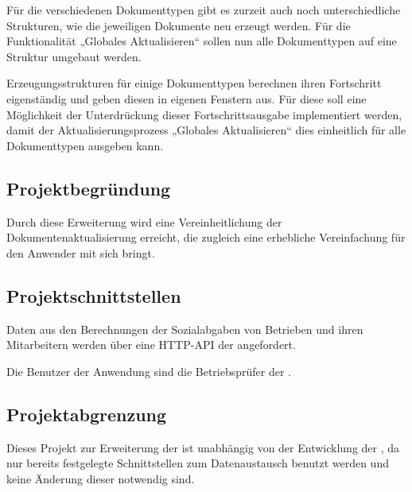 Für die verschiedenen Dokumenttypen gibt es zurzeit auch noch unterschiedliche Strukturen, wie die jeweiligen Dokumente neu erzeugt werden. Für die Funktionalität „Globales Aktualisieren“ sollen nun alle Dokumenttypen auf eine Struktur umgebaut werden.

Erzeugungsstrukturen für einige Dokumenttypen berechnen ihren Fortschritt eigenständig und geben diesen in eigenen Fenstern aus. Für diese soll eine Möglichkeit der Unterdrückung dieser Fortschrittsausgabe implementiert werden, damit der Aktualisierungsprozess „Globales Aktualisieren“ dies einheitlich für alle Dokumenttypen ausgeben kann.


\subsection{Projektbegründung} 
\label{sec:Projektbegruendung}

Durch diese Erweiterung wird eine Vereinheitlichung der Dokumentenaktualisierung erreicht, die zugleich eine erhebliche Vereinfachung für den Anwender mit sich bringt.


\subsection{Projektschnittstellen} 
\label{sec:Projektschnittstellen}

Daten aus den Berechnungen der Sozialabgaben von Betrieben und ihren Mitarbeitern werden über eine \acs{HTTP}-\acs{API} der \CBPNB angefordert.

Die Benutzer der Anwendung sind die Betriebsprüfer der \DRV.


\subsection{Projektabgrenzung} 
\label{sec:Projektabgrenzung}

Dieses Projekt zur Erweiterung der \CBPAD ist unabhängig von der Entwicklung der \CBPNB, da nur bereits festgelegte Schnittstellen zum Datenaustausch benutzt werden und keine Änderung dieser notwendig sind.



